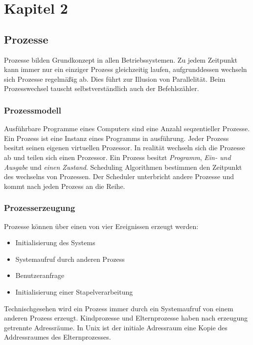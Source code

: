 \chapter{Kapitel 2}

\section{Prozesse}

Prozesse bilden Grundkonzept in allen Betriebssystemen. Zu jedem Zeitpunkt kann immer nur ein einziger Prozess gleichzeitig laufen, aufgrunddessen wechseln sich Prozesse regelmäßig ab. Dies führt zur Illusion von Parallelität. Beim Prozesswechsel tauscht selbstverständlich auch der Befehlszähler.

\subsection{Prozessmodell}

Ausführbare Programme eines Computers sind eine Anzahl seqzentieller Prozesse. Ein Prozess ist eine Instanz eines Programms in ausführung. Jeder Prozess besitzt seinen eigenen virtuellen Prozessor. In realität wechseln sich die Prozesse ab und teilen sich einen Prozessor. Ein Prozess besitzt \textit{Programm}, \textit{Ein- und Ausgabe} und \textit{einen Zustand}. Scheduling Algorithmen bestimmen den Zeitpunkt des wechselns von Prozessen. Der Scheduler unterbricht andere Prozesse und kommt nach jeden Prozess an die Reihe.

\subsection{Prozesserzeugung}

Prozesse können über einen von vier Ereignissen erzeugt werden:

\begin{itemize}
    \item Initialisierung des Systems
    \item Systemaufruf durch anderen Prozess
    \item Benutzeranfrage
    \item Initialisierung einer Stapelverarbeitung
\end{itemize}

Technischgesehen wird ein Prozess immer durch ein Systemaufruf von einem anderen Prozess erzeugt. Kindprozesse und Elternprozesse haben nach erzeugung getrennte Adressräume. In Unix ist der initiale Adressraum eine Kopie des Addressraumes des Elternprozesses. 

